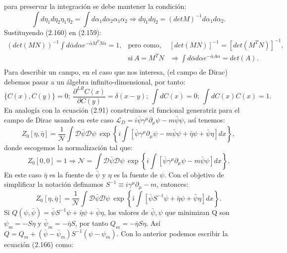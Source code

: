 para preservar la integración se debe mantener la condición:
\begin{equation}
\int d\eta_{1}d\eta_{2}\eta_{1}\eta_{2}=\int d\alpha_{1}d\alpha_{2}\alpha_{1}\alpha_{2}\Rightarrow d\eta_{1}d\eta_{2}=(detM)^{-1}d\alpha_{1}d\alpha_{2}.
\end{equation}
Sustituyendo (2.160) en (2.159):
\begin{eqnarray}
\nonumber (det(MN))^{-1}\int d\bar{\alpha}d\alpha e^{-\bar{\alpha}M^{T}N\alpha}=1,&\text{pero como,}& \left[det(MN)\right]^{-1}=\left[det(M^{T}N)\right]^{-1},\\
\nonumber &\text{si}\ A=M^TN&\Rightarrow \int d\bar{\alpha}d\alpha e^{-\bar{\alpha}A\alpha}=det(A).\\
\end{eqnarray}
Para describir un campo, en el caso que nos interesa, (el campo de Dirac) debemos pasar a un álgebra infinito-dimensional, por tanto:
\begin{equation}
\{C(x),C(y)\}=0; \ \frac{\partial^{LR}C(x)}{\partial C(y)}=\delta(x-y); \ \int dC(x)=0; \ \int dC(x)C(x)=1.
\end{equation}
En analogía con la ecuación (2.91) construimos el funcional generatriz para el campo de Dirac usando en este caso $\mathcal{L}_D=i\bar{\psi}\gamma^{\mu}\partial_{\mu}\psi-m\bar{\psi}\psi$, así tenemos:
\begin{equation}
Z_{0}[\eta,\bar{\eta}]=\frac{1}{\mathcal{N}}\int\mathcal{D}\bar{\psi}\mathcal{\mathcal{D}}\psi\ \exp\left\{ i\int\left[\bar{\psi}\gamma^{\mu}\partial_{\mu}\psi-m\bar{\psi}\psi+\bar{\eta}\psi+\bar{\psi}\eta\right]dx\right\} ,
\end{equation}
donde escogemos la normalización tal que:
\begin{equation}
Z_{0}[0,0]=1\Rightarrow\mathcal{N}=\int\mathcal{D}\bar{\psi}\mathcal{\mathcal{D}}\psi\ \exp\left\{ i\int\left[\bar{\psi}\gamma^{\mu}\partial_{\mu}\psi-m\bar{\psi}\psi\right]dx\right\} .
\end{equation}
En este caso $\bar{\eta}$ es la fuente de $\bar{\psi}$ y $\eta$ es la fuente de $\psi$. Con el objetivo de simplificar la notación definamos $S^{-1}\equiv i\gamma^{\mu}\partial_{\mu}-m$, entonces:
\begin{equation}
Z_{0}[\eta,\bar{\eta}]=\frac{1}{\mathcal{N}}\int\mathcal{D}\bar{\psi}\mathcal{\mathcal{D}}\psi\ \exp\left\{ i\int\left[\bar{\psi}S^{-1}\psi+\bar{\eta}\psi+\bar{\psi}\eta\right]dx\right\}.
\end{equation} 
Si $Q(\psi,\bar{\psi})=\bar{\psi}S^{-1}\psi+\bar{\eta}\psi+\bar{\psi}\eta$, los valores de $\bar{\psi},\psi$ que minimizan Q son $\psi_m=-S\eta$ y $\bar{\psi}_m=-\bar{\eta}S$, por tanto $Q_m=-\bar{\eta}S\eta$. Así $Q=Q_m+(\bar{\psi}-\bar{\psi}_m)S^{-1}(\psi-\psi_m)$. Con lo anterior podemos escribir la ecuación (2.166) como:
